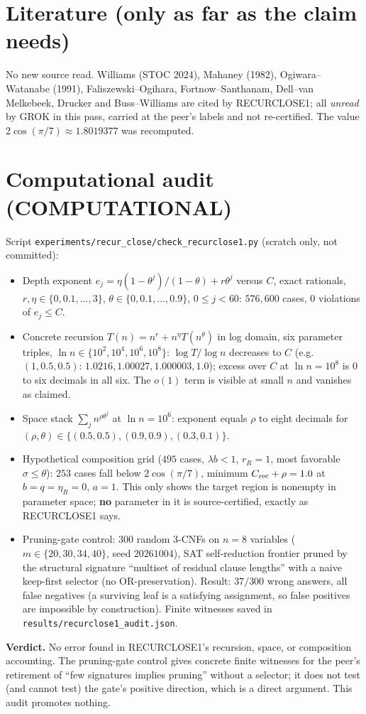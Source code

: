 \documentclass[11pt]{article}
\begin{document}
\section*{Literature (only as far as the claim needs)}
No new source read. Williams (STOC 2024), Mahaney (1982), Ogiwara--Watanabe (1991), Faliszewski--Ogihara,
Fortnow--Santhanam, Dell--van Melkebeek, Drucker and Buss--Williams are cited by RECURCLOSE1; all \emph{unread} by GROK
in this pass, carried at the peer's labels and not re-certified. The value $2\cos(\pi/7)\approx1.8019377$ was recomputed.

\section*{Computational audit (COMPUTATIONAL)}
Script \texttt{experiments/recur\_close/check\_recurclose1.py} (scratch only, not committed):
\begin{itemize}
\item Depth exponent $e_j=\eta(1-\theta^j)/(1-\theta)+r\theta^j$ versus $C$, exact rationals,
$r,\eta\in\{0,0.1,\ldots,3\}$, $\theta\in\{0,0.1,\ldots,0.9\}$, $0\le j<60$: $576{,}600$ cases, $0$ violations of $e_j\le C$.
\item Concrete recursion $T(n)=n^r+n^\eta T(n^\theta)$ in log domain, six parameter triples, $\ln n\in\{10^2,10^4,10^6,10^8\}$:
$\log T/\log n$ decreases to $C$ (e.g.\ $(1,0.5,0.5)$: $1.0216,1.00027,1.000003,1.0$); excess over $C$ at $\ln n=10^8$
is $0$ to six decimals in all six. The $o(1)$ term is visible at small $n$ and vanishes as claimed.
\item Space stack $\sum_j n^{\rho\theta^j}$ at $\ln n=10^6$: exponent equals $\rho$ to eight decimals for
$(\rho,\theta)\in\{(0.5,0.5),(0.9,0.9),(0.3,0.1)\}$.
\item Hypothetical composition grid ($495$ cases, $\lambda b<1$, $r_R=1$, most favorable $\sigma\le\theta$): $253$ cases
fall below $2\cos(\pi/7)$, minimum $C_{\rm rec}+\rho=1.0$ at $b=q=\eta_R=0$, $a=1$. This only shows the target region
is nonempty in parameter space; \textbf{no} parameter in it is source-certified, exactly as RECURCLOSE1 says.
\item Pruning-gate control: $300$ random 3-CNFs on $n=8$ variables ($m\in\{20,30,34,40\}$, seed $20261004$), SAT
self-reduction frontier pruned by the structural signature ``multiset of residual clause lengths'' with a naive
keep-first selector (no OR-preservation). Result: $37/300$ wrong answers, all false negatives (a surviving leaf is a
satisfying assignment, so false positives are impossible by construction). Finite witnesses saved in
\texttt{results/recurclose1\_audit.json}.
\end{itemize}
\textbf{Verdict.} No error found in RECURCLOSE1's recursion, space, or composition accounting. The pruning-gate control
gives concrete finite witnesses for the peer's retirement of ``few signatures implies pruning'' without a selector; it
does not test (and cannot test) the gate's positive direction, which is a direct argument. This audit promotes nothing.
\end{document}
